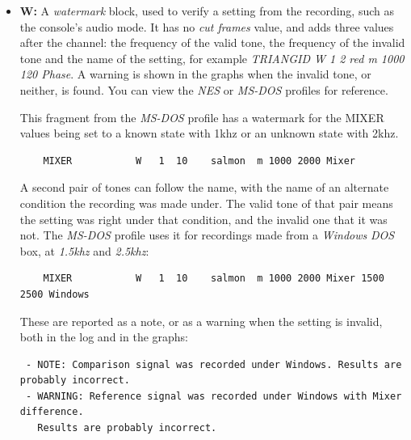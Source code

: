 \documentclass[10pt,a4paper]{report}
\newcommand{\khz}[1]{\textit{\mbox{#1\acrshort{khz}}}}
\begin{document}
\begin{appendices}
\begin{itemize}
Here is a fragment of the \textit{Sega CD} profile with \textit{skip} and \textit{internal sync} blocks:

\begin{verbatim}
	Wait            k   1   4  0 red     m
	PCMSTART        k   1   2  0 red     m
	PCM             4  28   5  0 magenta m
	PCMEND          k   1   2  0 red     m
	CD-Paused       i   1   2    red     m 8000 0.300
	CD-DA           5 128   5  0 orange  S
	CD-Paused       i   1   2    red     m 0 0
\end{verbatim}

The detected delays are reported in the log as the command delay, in milliseconds and frames.
	\item \textbf{W:} A \textit{watermark} block, used to verify a setting from the recording, such as the console's audio mode. It has no \textit{cut frames} value, and adds three values after the channel: the frequency of the valid tone, the frequency of the invalid tone and the name of the setting, for example \textit{TRIANGID W 1 2 red m 1000 120 Phase}. A warning is shown in the graphs when the invalid tone, or neither, is found. You can view the \textit{NES} or \textit{MS-DOS} profiles for reference.
	
	This fragment from the \textit{MS-DOS} profile has a watermark for the MIXER values being set to a known state with 1khz or an unknown state with 2khz.
\begin{verbatim}
	MIXER           W   1  10    salmon  m 1000 2000 Mixer
\end{verbatim}

	A second pair of tones can follow the name, with the name of an alternate condition the recording was made under. The valid tone of that pair means the setting was right under that condition, and the invalid one that it was not. The \textit{MS-DOS} profile uses it for recordings made from a \textit{Windows} \textit{DOS} box, at \khz{1.5} and \khz{2.5}:
\begin{verbatim}
	MIXER           W   1  10    salmon  m 1000 2000 Mixer 1500 2500 Windows
\end{verbatim}

	These are reported as a note, or as a warning when the setting is invalid, both in the log and in the graphs:
\begin{verbatim}
 - NOTE: Comparison signal was recorded under Windows. Results are probably incorrect.
 - WARNING: Reference signal was recorded under Windows with Mixer difference.
   Results are probably incorrect.
\end{verbatim}


\end{itemize}
\end{appendices}
\end{document}
